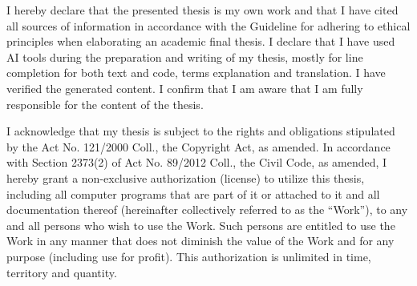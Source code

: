 \documentclass[english,bachelor,unicode,oneside,bw]{ctufit-thesis}
\begin{document}
\begin{declarationpage}
	I hereby declare that the presented thesis is my own work and that I have cited all sources of
	information in accordance with the Guideline for adhering to ethical principles when elaborating an
	academic final thesis.
	I declare that I have used AI tools during the preparation and writing of my thesis,
	mostly for line completion for both text and code, terms explanation and translation.
	I have verified the generated content.
	I confirm that I am aware that I am fully responsible for the content of the thesis.

	I acknowledge that my thesis is subject to the rights and obligations stipulated by the Act No.
	121/2000 Coll., the Copyright Act, as amended. In accordance with Section 2373(2) of Act No.
	89/2012 Coll., the Civil Code, as amended, I hereby grant a non-exclusive authorization (license) to
	utilize this thesis, including all computer programs that are part of it or attached to it and all
	documentation thereof (hereinafter collectively referred to as the ``Work''), to any and all persons
	who wish to use the Work. Such persons are entitled to use the Work in any manner that does not
	diminish the value of the Work and for any purpose (including use for profit). This authorization is
	unlimited in time, territory and quantity.
\end{declarationpage}

\printabstractpage{} %

% 
% 
% 
% 
% 
% 
% 
% 
% 
\end{document}
